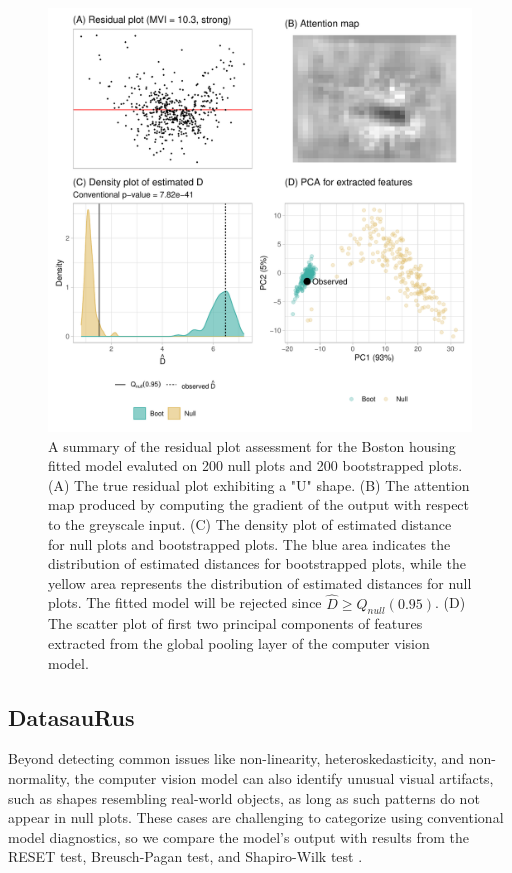 \documentclass[]{interact}
\theoremstyle{plain}%
\theoremstyle{definition}
\theoremstyle{remark}
\begin{document}
\begin{figure}[!h]

{\centering \includegraphics[width=0.8\linewidth]{paper_files/figure-latex/boston-check-1} 

}

\caption{A summary of the residual plot assessment for the Boston housing fitted model evaluted on 200 null plots and 200 bootstrapped plots. (A) The true residual plot exhibiting a "U" shape. (B) The attention map produced by computing the gradient of the output with respect to the greyscale input.  (C) The density plot of estimated distance for null plots and bootstrapped plots. The blue area indicates the distribution of estimated distances for bootstrapped plots, while the yellow area represents the distribution of estimated distances for null plots. The fitted model will be rejected since $\hat{D} \geq Q_{null}(0.95)$. (D) The scatter plot of first two principal components of features extracted from the global pooling layer of the computer vision model. }\label{fig:boston-check}
\end{figure}

\subsection{DatasauRus}\label{datasaurus}

Beyond detecting common issues like non-linearity, heteroskedasticity,
and non-normality, the computer vision model can also identify unusual
visual artifacts, such as shapes resembling real-world objects, as long
as such patterns do not appear in null plots. These cases are
challenging to categorize using conventional model diagnostics, so we
compare the model's output with results from the RESET test,
Breusch-Pagan test, and Shapiro-Wilk test \citep{shapiro1965analysis}.
\end{document}

